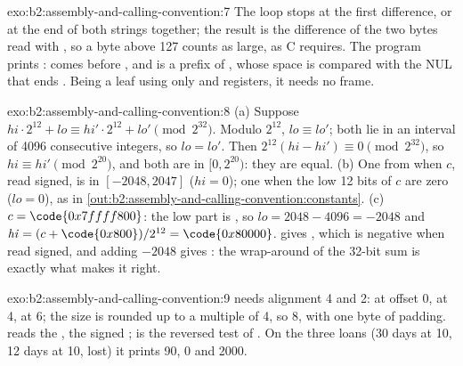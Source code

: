 \begin{solution}{exo:b2:assembly-and-calling-convention:7}
The loop stops at the first difference, or at the end of both strings together; the result is the difference of the
two bytes read with , so a byte above 127 counts as large, as C requires. The program prints :  comes before , and  is a prefix of , whose space is compared with the
NUL that ends . Being a leaf using only  and  registers, it needs no frame.
\end{solution}

\begin{solution}{exo:b2:assembly-and-calling-convention:8}
(a) Suppose $\mathit{hi} \cdot 2^{12} + \mathit{lo} \equiv \mathit{hi}' \cdot 2^{12} + \mathit{lo}' \pmod{2^{32}}$.
Modulo $2^{12}$, $\mathit{lo} \equiv \mathit{lo}'$; both lie in an interval of 4096 consecutive integers, so
$\mathit{lo} = \mathit{lo}'$. Then $2^{12}(\mathit{hi} - \mathit{hi}') \equiv 0 \pmod{2^{32}}$, so $\mathit{hi}
\equiv \mathit{hi}' \pmod{2^{20}}$, and both are in $[0, 2^{20})$: they are equal.
(b) One  from  when $c$, read signed, is in $[-2048, 2047]$ ($\mathit{hi} = 0$); one
 when the low 12 bits of $c$ are zero ($\mathit{lo} = 0$), as  in
\cref{out:b2:assembly-and-calling-convention:constants}.
(c) $c = \code{0x7ffff800}$: the low part is , so $\mathit{lo} = 2048 - 4096 = -2048$ and $\mathit{hi}
= (c + \code{0x800}) / 2^{12} = \code{0x80000}$.  gives , which is negative when read
signed, and adding $-2048$ gives : the wrap-around of the 32-bit sum is exactly what makes it right.
\end{solution}

\begin{solution}{exo:b2:assembly-and-calling-convention:9}
 needs alignment 4 and  2:  at offset 0,  at 4,  at 6; the
size is rounded up to a multiple of 4, so 8, with one byte of padding.
 reads the ,  the signed ;  is the reversed test of
. On the three loans (30 days at 10, 12 days at 10, lost) it prints 90, 0 and 2000.
\end{solution}

